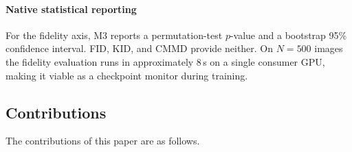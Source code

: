 \documentclass[lettersize,journal]{IEEEtran}
\begin{document}
\paragraph{Native statistical reporting}
For the fidelity axis, M3 reports a permutation-test $p$-value and a bootstrap 95\% confidence interval. FID, KID, and CMMD provide neither. On $N = 500$ images the fidelity evaluation runs in approximately $8$\,s on a single consumer GPU, making it viable as a checkpoint monitor during training.

\subsection{Contributions}
\label{sec:contributions}

The contributions of this paper are as follows.
\end{document}
